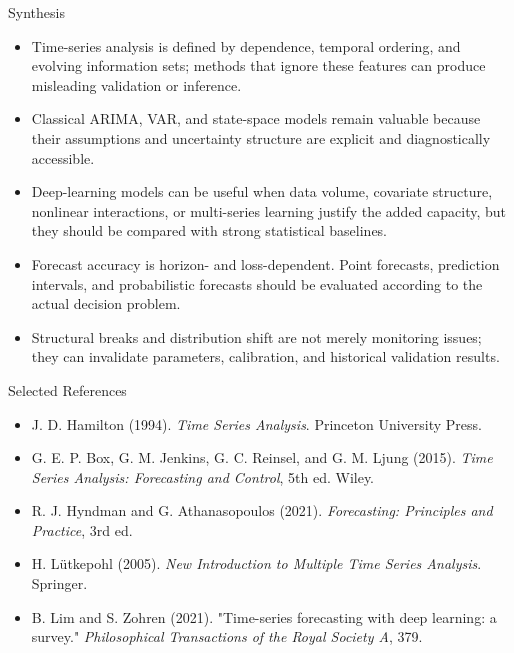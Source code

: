 \documentclass[aspectratio=169]{beamer}
\begin{document}
\begin{frame}{Synthesis}
  \begin{itemize}
    \item Time-series analysis is defined by dependence, temporal ordering, and evolving information sets; methods that ignore these features can produce misleading validation or inference.
    \item Classical ARIMA, VAR, and state-space models remain valuable because their assumptions and uncertainty structure are explicit and diagnostically accessible.
    \item Deep-learning models can be useful when data volume, covariate structure, nonlinear interactions, or multi-series learning justify the added capacity, but they should be compared with strong statistical baselines.
    \item Forecast accuracy is horizon- and loss-dependent. Point forecasts, prediction intervals, and probabilistic forecasts should be evaluated according to the actual decision problem.
    \item Structural breaks and distribution shift are not merely monitoring issues; they can invalidate parameters, calibration, and historical validation results.
  \end{itemize}
\end{frame}

\begin{frame}{Selected References}
  \small
  \begin{itemize}
    \item J. D. Hamilton (1994). \textit{Time Series Analysis}. Princeton University Press.
    \item G. E. P. Box, G. M. Jenkins, G. C. Reinsel, and G. M. Ljung (2015). \textit{Time Series Analysis: Forecasting and Control}, 5th ed. Wiley.
    \item R. J. Hyndman and G. Athanasopoulos (2021). \textit{Forecasting: Principles and Practice}, 3rd ed.
    \item H. Lütkepohl (2005). \textit{New Introduction to Multiple Time Series Analysis}. Springer.
    \item B. Lim and S. Zohren (2021). "Time-series forecasting with deep learning: a survey." \textit{Philosophical Transactions of the Royal Society A}, 379.
  \end{itemize}
\end{frame}

\contactslide
\end{document}
